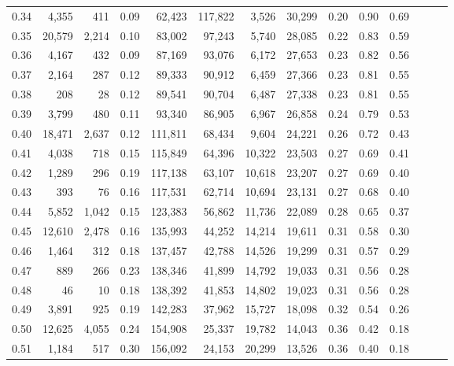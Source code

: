 \begin{tabular}{rrrrrrrrrrrrrr}
0.34 &   4,355 &    411 &  0.09 &   62,423 &  117,822 &   3,526 &  30,299 &  0.20 &  0.90 &      0.69 \\
0.35 &  20,579 &  2,214 &  0.10 &   83,002 &   97,243 &   5,740 &  28,085 &  0.22 &  0.83 &      0.59 \\
0.36 &   4,167 &    432 &  0.09 &   87,169 &   93,076 &   6,172 &  27,653 &  0.23 &  0.82 &      0.56 \\
0.37 &   2,164 &    287 &  0.12 &   89,333 &   90,912 &   6,459 &  27,366 &  0.23 &  0.81 &      0.55 \\
0.38 &     208 &     28 &  0.12 &   89,541 &   90,704 &   6,487 &  27,338 &  0.23 &  0.81 &      0.55 \\
0.39 &   3,799 &    480 &  0.11 &   93,340 &   86,905 &   6,967 &  26,858 &  0.24 &  0.79 &      0.53 \\
0.40 &  18,471 &  2,637 &  0.12 &  111,811 &   68,434 &   9,604 &  24,221 &  0.26 &  0.72 &      0.43 \\
0.41 &   4,038 &    718 &  0.15 &  115,849 &   64,396 &  10,322 &  23,503 &  0.27 &  0.69 &      0.41 \\
0.42 &   1,289 &    296 &  0.19 &  117,138 &   63,107 &  10,618 &  23,207 &  0.27 &  0.69 &      0.40 \\
0.43 &     393 &     76 &  0.16 &  117,531 &   62,714 &  10,694 &  23,131 &  0.27 &  0.68 &      0.40 \\
0.44 &   5,852 &  1,042 &  0.15 &  123,383 &   56,862 &  11,736 &  22,089 &  0.28 &  0.65 &      0.37 \\
0.45 &  12,610 &  2,478 &  0.16 &  135,993 &   44,252 &  14,214 &  19,611 &  0.31 &  0.58 &      0.30 \\
0.46 &   1,464 &    312 &  0.18 &  137,457 &   42,788 &  14,526 &  19,299 &  0.31 &  0.57 &      0.29 \\
0.47 &     889 &    266 &  0.23 &  138,346 &   41,899 &  14,792 &  19,033 &  0.31 &  0.56 &      0.28 \\
0.48 &      46 &     10 &  0.18 &  138,392 &   41,853 &  14,802 &  19,023 &  0.31 &  0.56 &      0.28 \\
0.49 &   3,891 &    925 &  0.19 &  142,283 &   37,962 &  15,727 &  18,098 &  0.32 &  0.54 &      0.26 \\
0.50 &  12,625 &  4,055 &  0.24 &  154,908 &   25,337 &  19,782 &  14,043 &  0.36 &  0.42 &      0.18 \\
0.51 &   1,184 &    517 &  0.30 &  156,092 &   24,153 &  20,299 &  13,526 &  0.36 &  0.40 &      0.18 \\

\end{tabular}
